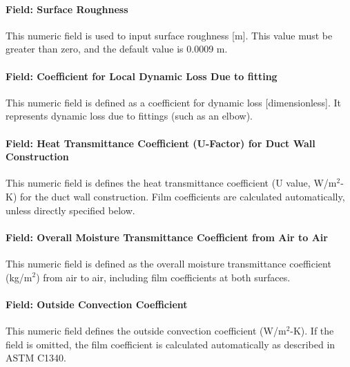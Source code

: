 \paragraph{Field: Surface Roughness}\label{field-surface-roughness}

This numeric field is used to input surface roughness {[}m{]}. This value must be greater than zero, and the default value is 0.0009 m.

\paragraph{Field: Coefficient for Local Dynamic Loss Due to fitting}\label{field-coefficient-for-local-dynamic-loss-due-to-fitting}

This numeric field is defined as a coefficient for dynamic loss {[}dimensionless{]}. It represents dynamic loss due to fittings (such as an elbow).

\paragraph{Field: Heat Transmittance Coefficient (U-Factor) for Duct Wall Construction}\label{field-heat-transmittance-coefficient-u-factor-from-duct-construction}

This numeric field is defines the heat transmittance coefficient (U value, W/m\(^{2}\)-K) for the duct wall construction. Film coefficients are calculated automatically, unless directly specified below.

\paragraph{Field: Overall Moisture Transmittance Coefficient from Air to Air}\label{field-overall-moisture-transmittance-coefficient-from-air-to-air}

This numeric field is defined as the overall moisture transmittance coefficient (kg/m\(^{2}\)) from air to air, including film coefficients at both surfaces.

\paragraph{Field: Outside Convection Coefficient}\label{field-outside-convection-coefficent}

This numeric field defines the outside convection coefficient (W/m\(^{2}\)-K). If the field is omitted, the film coefficient is calculated automatically as described in ASTM C1340.


